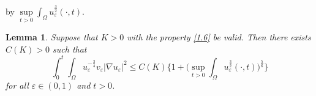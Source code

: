 \documentclass[12pt]{article}
\theoremstyle{plain}
\newtheorem{lemma}{Lemma}[section]
\theoremstyle{definition}
\numberwithin{equation}{section}
\begin{document}
 by $ \sup\limits_{t>0}\int_\Omega u_\varepsilon^{\frac3 2}(\cdot,t)$.
\begin{lemma}\label{lemma3.3}
Suppose that $K>0$ with the property \eqref{1.6} be valid. Then there exists $C(K)>0$ such that
    \begin{equation}\label{3.4}
        \int_0^{t}\int_\Omega u_\varepsilon^{-\frac3 4}v_\varepsilon|\nabla u_\varepsilon|^2\leq C(K)\bigg\{1+\bigg(\sup\limits_{t>0}\int_\Omega u_\varepsilon^{\frac3 2}(\cdot,t)\bigg)^{\frac{5}{6}}\bigg\}
    \end{equation}
    for all $\varepsilon\in(0,1)$ and $t>0$.
\end{lemma}
\end{document}
